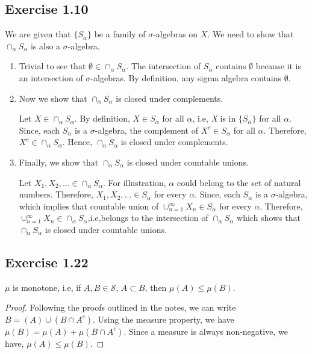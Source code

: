\documentclass[12pt]{article}
\begin{document}
	
\subsection{Exercise 1.10}	

We are given that $\{S_{\alpha}\}$ be a family of $\sigma$-algebras on $X$. We need to show that $\cap_{\alpha} S_{\alpha}$ is also a $\sigma$-algebra.

\begin{enumerate}

\item	Trivial to see that $\emptyset \in \cap_{\alpha} S_{\alpha}$. The intersection of ${S}_{\alpha}$ contains $\emptyset$ because it is an intersection of $\sigma$-algebras. By definition, any sigma algebra contains $\emptyset$.

\item Now we show that $\cap_{\alpha} S_{\alpha}$ is closed under complements.

Let $X \in \cap_{\alpha} S_{\alpha}$. By definition, $X \in S_{\alpha}$ for all $\alpha$, i.e, \textit{X} is in $\{S_{\alpha}\}$ for all $\alpha$. Since, each $S_{\alpha}$ is a $\sigma$-algebra, the complement of $X^c \in S_{\alpha}$ for all $\alpha$. Therefore, $X^c \in \cap_{\alpha} S_{\alpha}$. Hence, $\cap_{\alpha} S_{\alpha}$ is closed under complements.

\item Finally, we show that $\cap_{\alpha} S_{\alpha}$ is closed under countable unions.

Let $X_1, X_2,... \in \cap_{\alpha} S_{\alpha}$. For illustration, ${\alpha}$ could belong to the set of natural numbers. Therefore, $X_1, X_2, ... \in S_{\alpha}$ for every $\alpha$. Since, each $S_{\alpha}$ is a $\sigma$-algebra, which implies that countable union of $\cup_{n=1}^{\infty} X_n \in S_{\alpha}$ for every $\alpha$. Therefore, $\cup_{n=1}^{\infty} X_n \in \cap_{\alpha} S_{\alpha}$,i.e,belongs to the intersection of $\cap_{\alpha} S_{\alpha}$  which shows that $\cap_{\alpha} S_{\alpha}$ is closed under countable unions.


\end{enumerate}

\subsection{Exercise 1.22}
\begin{prop}
	$\mu$ is monotone, i.e, if $A,B \in \mathcal{S}$, $A \subset B$, then $\mu(A) \leq \mu(B)$.
\end{prop}
\begin{proof}
	Following the proofs outlined in the notes, we can write  $B = (A) \cup (B \cap A^c) $. Using the measure property, we have $\mu(B) =\mu(A)+ \mu(B \cap A^c)$. Since a measure is always non-negative, we have, $\mu(A) \leq \mu(B)$.
\end{proof}
\end{document}

